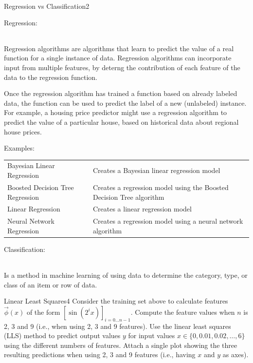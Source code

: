 \begin{questions}
\begin{question}{Regression vs Classification}{2}
\begin{answer}
					\begin{large}
						Regression:
					\end{large}
					\\Regression algorithms are algorithms that learn to predict the value of a real function for a single instance of data. Regression algorithms can incorporate input from multiple features, by deterng the contribution of each feature of the data to the regression function. 
					
					Once the regression algorithm has trained a function based on already labeled data, the function can be used to predict the label of a new (unlabeled) instance. For example, a housing price predictor might use a regression algorithm to predict the value of a particular house, based on historical data about regional house prices.
					
					Examples:\\
					\begin{tabular}{l l }
						Bayesian Linear Regression & Creates a Bayesian linear regression model\\
						Boosted Decision Tree Regression & Creates a regression model using the Boosted Decision Tree algorithm \\
						Linear Regression & Creates a linear regression model \\
						Neural Network Regression & Creates a regression model using a neural network algorithm \\
						
					\end{tabular}
					
					\begin{large}
						Classification:
					\end{large}
					\\Is a method in machine learning of using data to determine the category, type, or class of an item or row of data. 
	\end{answer}
	\end{question}
	
	
	
	\begin{question}{Linear Least Squares}{4}
		Consider the training set above to calculate features $\vec{\phi}(x)$ of the form $[\sin(2^{i}x)]_{i = 0 \ldots n-1}$. 
		Compute the feature values when $n$ is 2, 3 and 9 (i.e., when using 2, 3 and 9 features). 
		Use the linear least squares (LLS) method to predict output values $y$ for input values $x\in\{0, 0.01, 0.02, \ldots, 6\}$ using the different numbers of features. 
		Attach a single plot showing the three resulting predictions when using 2, 3 and 9 features (i.e., having $x$ and $y$ as axes).
		

\end{question}
\end{questions}
